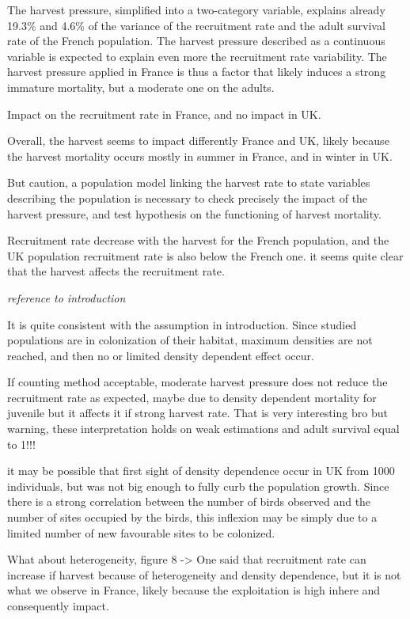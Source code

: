 \documentclass[
  english,
]{article}
\begin{document}
The harvest pressure, simplified into a two-category variable, explains already 19.3\% and 4.6\% of the variance of the recruitment rate and the adult survival rate of the French population. The harvest pressure described as a continuous variable is expected to explain even more the recruitment rate variability. The harvest pressure applied in France is thus a factor that likely induces a strong immature mortality, but a moderate one on the adults.

Impact on the recruitment rate in France, and no impact in UK.

Overall, the harvest seems to impact differently France and UK, likely because the harvest mortality occurs mostly in summer in France, and in winter in UK.

But caution, a population model linking the harvest rate to state variables describing the population is necessary to check precisely the impact of the harvest pressure, and test hypothesis on the functioning of harvest mortality.

Recruitment rate decrease with the harvest for the French population, and the UK population recruitment rate is also below the French one.
it seems quite clear that the harvest affects the recruitment rate.

\emph{reference to introduction}

It is quite consistent with the assumption in introduction. Since studied populations are in colonization of their habitat, maximum densities are not reached, and then no or limited density dependent effect occur.

If counting method acceptable, moderate harvest pressure does not reduce the recruitment rate as expected, maybe due to density dependent mortality for juvenile but it affects it if strong harvest rate. That is very interesting bro but warning, these interpretation holds on weak estimations and adult survival equal to 1!!!

it may be possible that first sight of density dependence occur in UK from 1000 individuals, but was not big enough to fully curb the population growth. Since there is a strong correlation between the number of birds observed and the number of sites occupied by the birds, this inflexion may be simply due to a limited number of new favourable sites to be colonized.

What about heterogeneity, figure 8 -\textgreater{} One said that recruitment rate can increase if harvest because of heterogeneity and density dependence, but it is not what we observe in France, likely because the exploitation is high inhere and consequently impact.
\end{document}
